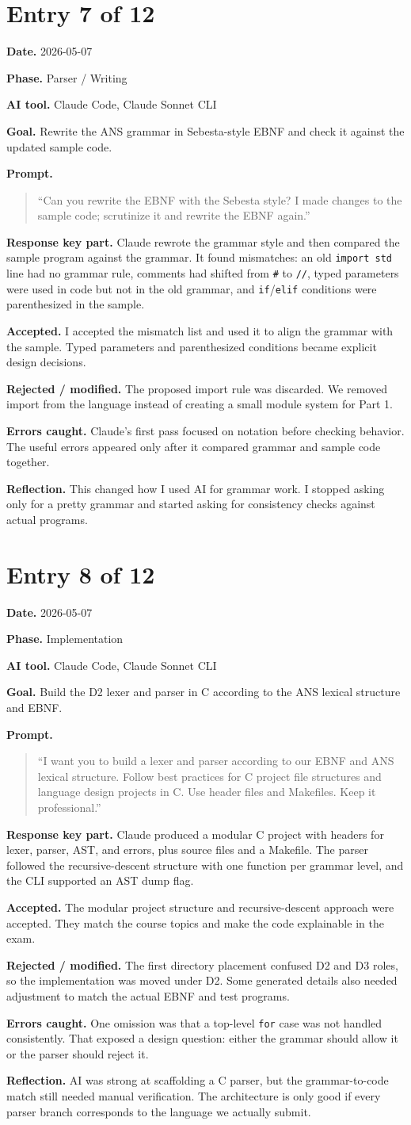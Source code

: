 \documentclass[11pt,a4paper]{article}
\newcommand{\code}[1]{\texttt{#1}}
\newcommand{\field}[2]{\textbf{#1.} #2\par}
\newcommand{\prompt}[1]{%
  \textbf{Prompt.}
  \begin{quote}\small #1\end{quote}
}
\begin{document}
\section{Entry 7 of 12}
\field{Date}{2026-05-07}
\field{Phase}{Parser / Writing}
\field{AI tool}{Claude Code, Claude Sonnet CLI}
\field{Goal}{Rewrite the ANS grammar in Sebesta-style EBNF and check it against the updated sample code.}
\prompt{``Can you rewrite the EBNF with the Sebesta style? I made changes to the sample code; scrutinize it and rewrite the EBNF again.''}
\field{Response key part}{Claude rewrote the grammar style and then compared the sample program against the grammar. It found mismatches: an old \code{import std} line had no grammar rule, comments had shifted from \code{\#} to \code{//}, typed parameters were used in code but not in the old grammar, and \code{if}/\code{elif} conditions were parenthesized in the sample.}
\field{Accepted}{I accepted the mismatch list and used it to align the grammar with the sample. Typed parameters and parenthesized conditions became explicit design decisions.}
\field{Rejected / modified}{The proposed import rule was discarded. We removed import from the language instead of creating a small module system for Part 1.}
\field{Errors caught}{Claude's first pass focused on notation before checking behavior. The useful errors appeared only after it compared grammar and sample code together.}
\field{Reflection}{This changed how I used AI for grammar work. I stopped asking only for a pretty grammar and started asking for consistency checks against actual programs.}

\section{Entry 8 of 12}
\field{Date}{2026-05-07}
\field{Phase}{Implementation}
\field{AI tool}{Claude Code, Claude Sonnet CLI}
\field{Goal}{Build the D2 lexer and parser in C according to the ANS lexical structure and EBNF.}
\prompt{``I want you to build a lexer and parser according to our EBNF and ANS lexical structure. Follow best practices for C project file structures and language design projects in C. Use header files and Makefiles. Keep it professional.''}
\field{Response key part}{Claude produced a modular C project with headers for lexer, parser, AST, and errors, plus source files and a Makefile. The parser followed the recursive-descent structure with one function per grammar level, and the CLI supported an AST dump flag.}
\field{Accepted}{The modular project structure and recursive-descent approach were accepted. They match the course topics and make the code explainable in the exam.}
\field{Rejected / modified}{The first directory placement confused D2 and D3 roles, so the implementation was moved under D2. Some generated details also needed adjustment to match the actual EBNF and test programs.}
\field{Errors caught}{One omission was that a top-level \code{for} case was not handled consistently. That exposed a design question: either the grammar should allow it or the parser should reject it.}
\field{Reflection}{AI was strong at scaffolding a C parser, but the grammar-to-code match still needed manual verification. The architecture is only good if every parser branch corresponds to the language we actually submit.}
\end{document}

